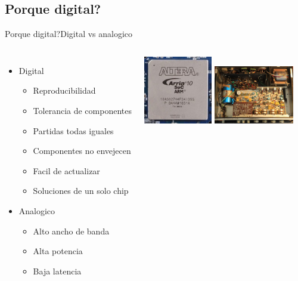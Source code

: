 \subsection{Porque digital?}
 \begin{frame}{Porque digital?}{Digital vs analogico}
    \begin{columns}[onlytextwidth]
       \begin{itemize}
          \item{Digital}
             \begin{itemize}
                \item{Reproducibilidad}
                \item{Tolerancia de componentes}
                \item{Partidas todas iguales}
                \item{Componentes no envejecen}
                \item{Facil de actualizar}
                \item{Soluciones de un solo chip}
             \end{itemize}
          \item{Analogico}
             \begin{itemize}
                \item{Alto ancho de banda}
                \item{Alta potencia}
                \item{Baja latencia}
             \end{itemize}
       \end{itemize}
       \includegraphics[width=30mm]{1_clase/fpga}
       \newline
       \includegraphics[width=35mm]{1_clase/transistor_amp}
    \end{columns}
 \end{frame}


